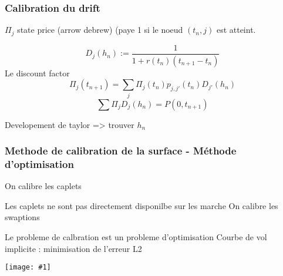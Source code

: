 \documentclass[paper=a4, fontsize=11pt]{scrartcl}
\numberwithin{equation}{section}		%
\numberwithin{figure}{section}			%
\numberwithin{table}{section}				%
\newcommand{\IMG}[3]{
\texttt{[image: \#1]}%
}
\begin{document}
\subsubsection{Calibration du drift}

$\Pi_j$ state price (arrow debrew) (paye 1 si le noeud $(t_n, j)$ est atteint.

$$D_j(h_n) := \frac{1}{1 + r(t_n)(t_{n+1} - t_n)} $$ Le discount factor
$$ \Pi_j(t_{n+1}) = \sum_j \Pi_j(t_n) p_{j, j'}(t_n) D_{j'}(h_n)$$
$$ \sum \Pi_j D_j(h_n) = P(0, t_{n+1}) $$

Developement de taylor => trouver $h_n$


\subsubsection{Methode de calibration de la surface - Méthode d'optimisation}

On calibre les caplets

Les caplets ne sont pas directement disponilbe sur les marche
On calibre les swaptions

Le probleme de calbration est un probleme d'optimisation
Courbe de vol implicite :
minimisation de l'erreur L2

\IMG{img/capsurf.png}{Cap surface}{0.5}
\end{document}
